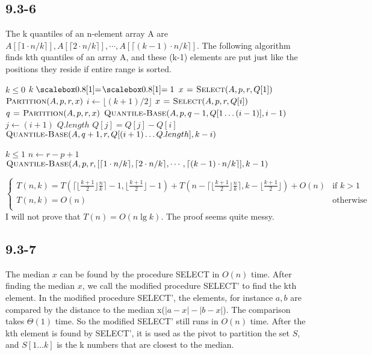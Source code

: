 \documentclass{book}
\begin{document}
\begin{CJK}{UTF8}{gkai}
\subsection*{9.3-6}
The k quantiles of an n-element array A are
$A[\lceil 1\cdot n/k \rceil], A[\lceil 2\cdot n/k \rceil],\cdots,A[\lceil 
(k-1)\cdot n/k \rceil]$.
The following algorithm finds kth quantiles of an array A, and these (k-1) 
elements are put  just like the positions they reside if entire range is sorted.

\begin{codebox}
\li \If $k \le 0$
\li \Then \Return
\li \ElseIf $k \isequal 1$
\li \Then $x \mathrel{\hspace{1pt}=\hspace{1pt}} \textnormal{\scshape Select}(A,p,r,Q[1])$
\li $\textnormal{\scshape Partition}(A,p,r,x)$
\li \Else $i \gets \lfloor(k+1)/2\rfloor$
\li $x \mathrel{\hspace{1pt}=\hspace{1pt}} \textnormal{\scshape Select}(A,p,r,Q[i])$
\li $q \mathrel{\hspace{1pt}=\hspace{1pt}} \textnormal{\scshape Partition}(A,p,r,x)$
\li $\textnormal{\scshape Quantile-Base}(A,p,q-1,Q[1\dots (i-1)], i-1)$
\li \For $j \gets (i+1)$ \To $Q.length$
\li \Do $Q[j] = Q[j] - Q[i]$
\End
\li $\textnormal{\scshape Quantile-Base}(A, q+1, r, Q[(i+1)\dots Q.length], k-i)$
\End
\end{codebox}

\begin{codebox}
\li \If $k \le 1$
\li \Then \Return
\li \Else $n \gets r-p+1$
\li $\textnormal{\scshape Quantile-Base}(A,p,r,[\lceil 1\cdot n/k\rceil, \lceil 2\cdot 
n/k\rceil,\cdots, \lceil (k-1)\cdot n/k\rceil], k-1)$
\end{codebox}

$$
\left\{
\begin{array}{ll}
T(n, k) = T(\lceil\lfloor \frac{k+1}{2} \rfloor \frac{n}{k}\rceil-1, 
\lfloor\frac{k+1}{2}\rfloor-1) + T(n-\lceil\lfloor \frac{k+1}{2} \rfloor 
\frac{n}{k}\rceil, k - \lfloor\frac{k+1}{2}\rfloor) + O(n) & \mbox{if } k > 
1 \\ T(n, k) = O(n) & \mbox{otherwise}\\
\end{array}
\right.
$$
I will not prove that $T(n) = O(n\lg k)$. The proof seems quite messy.

\subsection*{9.3-7}
The median $x$ can be found by the procedure SELECT in $O(n)$ time. After 
finding the median $x$, we call the modified procedure SELECT' to find the kth 
element. In the modified procedure SELECT', the elements, for instance $a, b$ 
are compared by the distance to the median x($|a-x| - |b-x|$). The comparison 
takes $\Theta(1)$ time. So the modified SELECT' still runs in $O(n)$ time. After 
the kth element is found by SELECT', it is used as the pivot to partition the 
set $S$, and $S[1\dots k]$ is the k numbers that are closest to the median.


\end{CJK}
\end{document}

